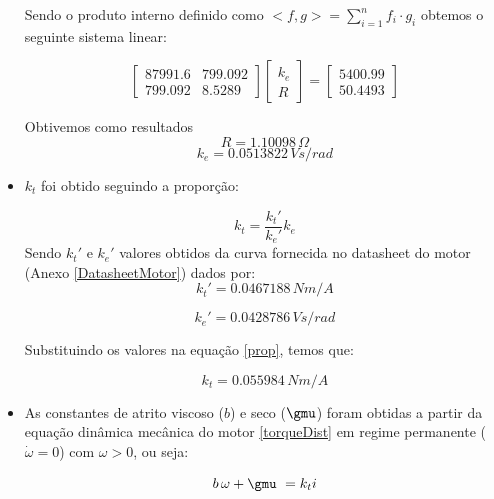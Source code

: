 \documentclass[]{politex}
\begin{document}
\begin{itemize}
Sendo o produto interno definido como $ <f,g> = \displaystyle\sum_{i=1}^n f_i \cdot g_i $ obtemos o seguinte sistema linear:

\begin{equation}
\begin{bmatrix}
87991.6 & 799.092\\
799.092 & 8.5289
\end{bmatrix}
\begin{bmatrix}
k_{e}\\
R
\end{bmatrix}= 
\begin{bmatrix}
5400.99\\
50.4493
\end{bmatrix}
\end{equation}

Obtivemos como resultados
\begin{equation}
R = 1.10098 \, \Omega 
\end{equation}
\begin{equation}
k_e = 0.0513822 \, V s/rad
\end{equation}

\item $k_{t}$ foi obtido seguindo a proporção:

\begin{equation}
\label{prop}
k_{t} = \frac{k_{t}'}{k_{e}'} k_{e}
\end{equation}
Sendo $k_{t}'$ e $k_{e}'$ valores obtidos da curva fornecida no datasheet do motor (Anexo \ref{DatasheetMotor}) dados por:
\begin{equation}
k_{t}' = 0.0467188 \, N m/A
\end{equation}

\begin{equation}
k_{e}' = 0.0428786 \, V s/rad
\end{equation}

Substituindo os valores na equação \eqref{prop}, temos que:

\begin{equation}
k_t = 0.055984 \, N m/A
\end{equation}

\item As constantes de atrito viscoso ($b$) e seco ($\gmu$) foram obtidas a partir da equação dinâmica mecânica do motor \eqref{torqueDist} em regime permanente ($\dot{\omega}=0$) com $\omega > 0$, ou seja: 

\begin{equation}
\label{dimMec}
b \, \omega+\gmu \ = k_{t} i
\end{equation}


\end{itemize}
\end{document}

